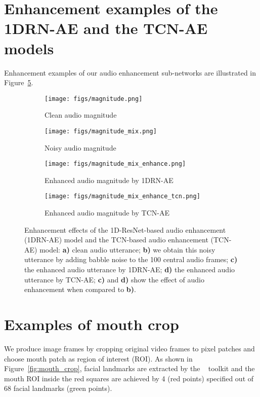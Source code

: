 \documentclass[10pt,twocolumn,letterpaper]{article}
\begin{document}
\section{Enhancement examples of the 1DRN-AE and the TCN-AE models}\label{enhancement}
Enhancement examples of our audio enhancement sub-networks are illustrated in Figure~\ref{fig:visualization}.
\begin{figure}[t]
\centering
    \begin{subfigure}[t]{0.47\textwidth}
\centering
        \texttt{[image: figs/magnitude.png]}
\caption{Clean audio magnitude}\label{fig:5a}
    \end{subfigure}
    \qquad 
    \begin{subfigure}[t]{0.47\textwidth}
\centering
        \texttt{[image: figs/magnitude\_mix.png]}
\caption{Noisy audio magnitude}\label{fig:5b}
    \end{subfigure}
    \quad 
    \begin{subfigure}[t]{0.47\textwidth}
\centering
        \texttt{[image: figs/magnitude\_mix\_enhance.png]}
\caption{Enhanced audio magnitude by 1DRN-AE}\label{fig:5c}
    \end{subfigure}
    \qquad
    \begin{subfigure}[t]{0.47\textwidth}
\centering
        \texttt{[image: figs/magnitude\_mix\_enhance\_tcn.png]}
\caption{Enhanced audio magnitude by TCN-AE}\label{fig:5a}
    \end{subfigure}
\caption{Enhancement effects of the 1D-ResNet-based audio enhancement (1DRN-AE) model and the TCN-based audio enhancement (TCN-AE) model: {\bf a)} clean audio utterance; {\bf b)} we obtain this noisy utterance by adding babble noise to the 100 central audio frames; {\bf c)} the enhanced audio utterance by 1DRN-AE; {\bf d)} the enhanced audio utterance by TCN-AE; {\bf c)} and {\bf d)} show the effect of audio enhancement when compared to {\bf b)}.}
\label{fig:visualization}
\end{figure}
\section{Examples of mouth crop}\label{mouth_crop}
We produce image frames by cropping original video frames to  pixel patches and choose mouth patch as region of interest (ROI). As shown in Figure~\ref{fig:mouth_crop}, facial landmarks are extracted by the ~\cite{king2009dlib} toolkit and the mouth ROI inside the red squares are achieved by 4 (red points) specified out of 68 facial landmarks (green points).
\end{document}
